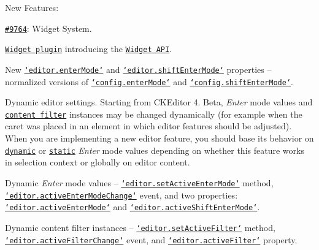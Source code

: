 New Features\-:
\begin{DoxyItemize}
\item \href{http://dev.ckeditor.com/ticket/9764}{\tt \#9764}\-: Widget System.
\begin{DoxyItemize}
\item \href{http://ckeditor.com/addon/widget}{\tt Widget plugin} introducing the \href{http://docs.ckeditor.com/#!/api/CKEDITOR.plugins.widget}{\tt Widget A\-P\-I}.
\item New \href{http://docs.ckeditor.com/#!/api/CKEDITOR.editor-property-enterMode}{\tt `editor.enter\-Mode`} and \href{http://docs.ckeditor.com/#!/api/CKEDITOR.editor-property-shiftEnterMode}{\tt `editor.shift\-Enter\-Mode`} properties -- normalized versions of \href{http://docs.ckeditor.com/#!/api/CKEDITOR.config-cfg-enterMode}{\tt `config.enter\-Mode`} and \href{http://docs.ckeditor.com/#!/api/CKEDITOR.config-cfg-shiftEnterMode}{\tt `config.shift\-Enter\-Mode`}.
\item Dynamic editor settings. Starting from C\-K\-Editor 4. Beta, {\itshape Enter} mode values and \href{http://docs.ckeditor.com/#!/guide/dev_advanced_content_filter}{\tt content filter} instances may be changed dynamically (for example when the caret was placed in an element in which editor features should be adjusted). When you are implementing a new editor feature, you should base its behavior on \href{http://docs.ckeditor.com/#!/api/CKEDITOR.editor-property-activeEnterMode}{\tt dynamic} or \href{http://docs.ckeditor.com/#!/api/CKEDITOR.editor-property-enterMode}{\tt static} {\itshape Enter} mode values depending on whether this feature works in selection context or globally on editor content.
\begin{DoxyItemize}
\item Dynamic {\itshape Enter} mode values -- \href{http://docs.ckeditor.com/#!/api/CKEDITOR.editor-method-setActiveEnterMode}{\tt `editor.set\-Active\-Enter\-Mode`} method, \href{http://docs.ckeditor.com/#!/api/CKEDITOR.editor-event-activeEnterModeChange}{\tt `editor.active\-Enter\-Mode\-Change`} event, and two properties\-: \href{http://docs.ckeditor.com/#!/api/CKEDITOR.editor-property-activeEnterMode}{\tt `editor.active\-Enter\-Mode`} and \href{http://docs.ckeditor.com/#!/api/CKEDITOR.editor-property-activeShiftEnterMode}{\tt `editor.active\-Shift\-Enter\-Mode`}.
\item Dynamic content filter instances -- \href{http://docs.ckeditor.com/#!/api/CKEDITOR.editor-method-setActiveFilter}{\tt `editor.set\-Active\-Filter`} method, \href{http://docs.ckeditor.com/#!/api/CKEDITOR.editor-event-activeFilterChange}{\tt `editor.active\-Filter\-Change`} event, and \href{http://docs.ckeditor.com/#!/api/CKEDITOR.editor-property-activeFilter}{\tt `editor.active\-Filter`} property.

\end{DoxyItemize}
\end{DoxyItemize}
\end{DoxyItemize}
